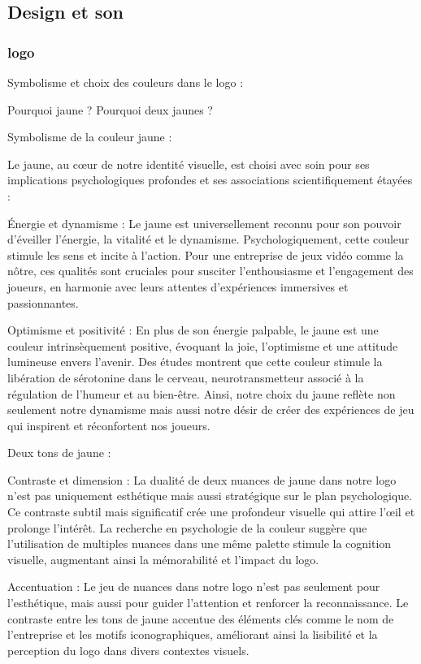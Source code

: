\subsection{Design et son}

\subsubsection{logo}
Symbolisme et choix des couleurs dans le logo :


Pourquoi jaune ? Pourquoi deux jaunes ? 

Symbolisme de la couleur jaune : 

Le jaune, au cœur de notre identité visuelle, est choisi avec soin pour ses implications psychologiques profondes et ses associations scientifiquement étayées : 

Énergie et dynamisme : Le jaune est universellement reconnu pour son pouvoir d'éveiller l'énergie, la vitalité et le dynamisme. Psychologiquement, cette couleur stimule les sens et incite à l'action. Pour une entreprise de jeux vidéo comme la nôtre, ces qualités sont cruciales pour susciter l'enthousiasme et l'engagement des joueurs, en harmonie avec leurs attentes d'expériences immersives et passionnantes. 

Optimisme et positivité : En plus de son énergie palpable, le jaune est une couleur intrinsèquement positive, évoquant la joie, l'optimisme et une attitude lumineuse envers l'avenir. Des études montrent que cette couleur stimule la libération de sérotonine dans le cerveau, neurotransmetteur associé à la régulation de l'humeur et au bien-être. Ainsi, notre choix du jaune reflète non seulement notre dynamisme mais aussi notre désir de créer des expériences de jeu qui inspirent et réconfortent nos joueurs. 

Deux tons de jaune : 

Contraste et dimension : La dualité de deux nuances de jaune dans notre logo n'est pas uniquement esthétique mais aussi stratégique sur le plan psychologique. Ce contraste subtil mais significatif crée une profondeur visuelle qui attire l'œil et prolonge l'intérêt. La recherche en psychologie de la couleur suggère que l'utilisation de multiples nuances dans une même palette stimule la cognition visuelle, augmentant ainsi la mémorabilité et l'impact du logo. 

Accentuation : Le jeu de nuances dans notre logo n'est pas seulement pour l'esthétique, mais aussi pour guider l'attention et renforcer la reconnaissance. Le contraste entre les tons de jaune accentue des éléments clés comme le nom de l'entreprise et les motifs iconographiques, améliorant ainsi la lisibilité et la perception du logo dans divers contextes visuels. 

